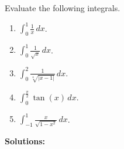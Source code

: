 \bigskip
\begin{example} Evaluate the following integrals.
    \begin{enumerate}
\renewcommand{\labelenumi}{(\alph{enumi})}
\setlength{\itemsep}{.2cm}

 \item $\int_0 ^1 \frac{1}{x} \, dx$.
 
    \item $\int_0 ^1 \frac{1}{\sqrt{x}} \, dx$.

    \item $\int_0 ^2 \frac{1}{\sqrt[4]{|x-1|}}\, dx$.

    \item $\int_0 ^\frac{\pi}{2} \tan(x) \, dx$.

    \item $\int_{-1} ^1 \frac{x}{\sqrt{1 - x^2}} \, dx$.

\end{enumerate}
\end{example}
\textbf{Solutions:}

